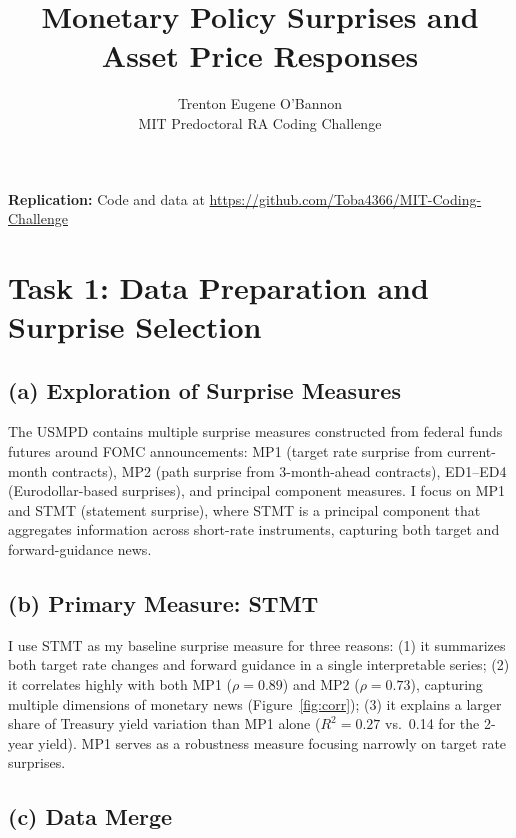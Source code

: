 \documentclass[12pt]{article}
\title{\textbf{Monetary Policy Surprises and Asset Price Responses}}
\author{Trenton Eugene O'Bannon\\MIT Predoctoral RA Coding Challenge}
\date{}
\begin{document}
\maketitle
\thispagestyle{empty}

\vspace{-1em}
\noindent\textbf{Replication:} Code and data at \url{https://github.com/Toba4366/MIT-Coding-Challenge}

\section*{Task 1: Data Preparation and Surprise Selection}

\subsection*{(a) Exploration of Surprise Measures}

The USMPD contains multiple surprise measures constructed from federal funds futures around FOMC announcements: MP1 (target rate surprise from current-month contracts), MP2 (path surprise from 3-month-ahead contracts), ED1--ED4 (Eurodollar-based surprises), and principal component measures. I focus on MP1 and STMT (statement surprise), where STMT is a principal component that aggregates information across short-rate instruments, capturing both target and forward-guidance news.

\subsection*{(b) Primary Measure: STMT}

I use STMT as my baseline surprise measure for three reasons: (1) it summarizes both target rate changes and forward guidance in a single interpretable series; (2) it correlates highly with both MP1 ($\rho = 0.89$) and MP2 ($\rho = 0.73$), capturing multiple dimensions of monetary news (Figure~\ref{fig:corr}); (3) it explains a larger share of Treasury yield variation than MP1 alone ($R^2 = 0.27$ vs.\ 0.14 for the 2-year yield). MP1 serves as a robustness measure focusing narrowly on target rate surprises.

\subsection*{(c) Data Merge}
\end{document}
